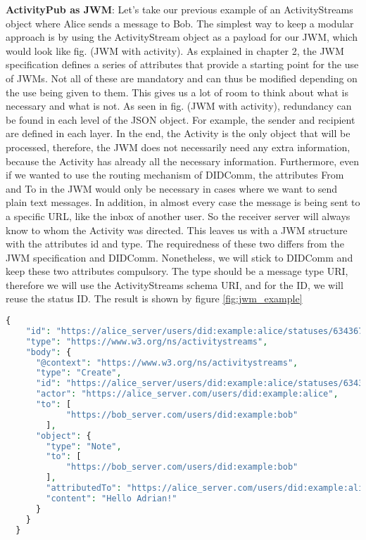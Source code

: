 \textbf{ActivityPub as JWM}: Let's take our previous example of an ActivityStreams object where Alice sends a message to Bob. The simplest way to keep a modular approach is by using the ActivityStream object as a payload for our JWM, which would look like fig. (JWM with activity). As explained in chapter 2, the JWM specification defines a series of attributes that provide a starting point for the use of JWMs. Not all of these are mandatory and can thus be modified depending on the use being given to them. This gives us a lot of room to think about what is necessary and what is not. As seen in fig. (JWM with activity), redundancy can be found in each level of the JSON object. For example, the sender and recipient are defined in each layer. In the end, the Activity is the only object that will be processed, therefore, the JWM does not necessarily need any extra information, because the Activity has already all the necessary information. Furthermore, even if we wanted to use the routing mechanism of DIDComm, the attributes From and To in the JWM would only be necessary in cases where we want to send plain text messages. In addition, in almost every case the message is being sent to a specific URL, like the inbox of another user. So the receiver server will always know to whom the Activity was directed. This leaves us with a JWM structure with the attributes id and type. The requiredness of these two differs from the JWM specification and DIDComm. Nonetheless, we will stick to DIDComm and keep these two attributes compulsory. The type should be a message type URI, therefore we will use the ActivityStreams schema URI, and for the ID, we will reuse the status ID. The result is shown by figure \ref{fig:jwm_example}

\lstset{style=JSONStyle}
\begin{lstlisting}[language=PHP, caption=JWM example, label=fig:jwm_example, float=h]
  {
    "id": "https://alice_server/users/did:example:alice/statuses/634367/activity",
    "type": "https://www.w3.org/ns/activitystreams",
    "body": {
      "@context": "https://www.w3.org/ns/activitystreams",
      "type": "Create",
      "id": "https://alice_server/users/did:example:alice/statuses/634367/activity",
      "actor": "https://alice_server.com/users/did:example:alice",
      "to": [ 
            "https://bob_server.com/users/did:example:bob"
        ],
      "object": {
        "type": "Note",
        "to": [ 
            "https://bob_server.com/users/did:example:bob"
        ],
        "attributedTo": "https://alice_server.com/users/did:example:alice",
        "content": "Hello Adrian!"
      }
    }
  }
\end{lstlisting}



